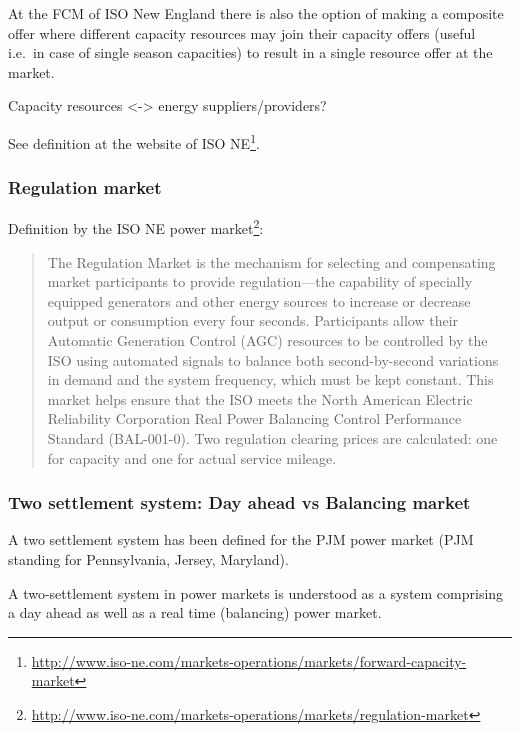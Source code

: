 At the FCM of ISO New England there is also the option of making a composite offer where different capacity resources may join their capacity offers (useful i.e.~in case of single season capacities) to result in a single resource offer at the market. 

Capacity resources <-> energy suppliers/providers?

See definition at the website of ISO NE\footnote{\url{http://www.iso-ne.com/markets-operations/markets/forward-capacity-market}}.

\subsubsection{Regulation market}

Definition by the ISO NE power market\footnote{\url{http://www.iso-ne.com/markets-operations/markets/regulation-market}}:

\begin{quote}
The Regulation Market is the mechanism for selecting and compensating market participants to provide regulation—the capability of specially equipped generators and other energy sources to increase or decrease output or consumption every four seconds. Participants allow their Automatic Generation Control (AGC) resources to be controlled by the ISO using automated signals to balance both second-by-second variations in demand and the system frequency, which must be kept constant. This market helps ensure that the ISO meets the North American Electric Reliability Corporation Real Power Balancing Control Performance Standard (BAL-001-0). Two regulation clearing prices are calculated: one for capacity and one for actual service mileage.
\end{quote}




\subsubsection{Two settlement system: Day ahead vs Balancing market}

A two settlement system has been defined for the PJM power market (PJM standing for Pennsylvania, Jersey, Maryland)\cite{lambert2001creating}. 

A two-settlement system in power markets is understood as a system comprising a day ahead as well as a real time (balancing) power market\cite{lambert2001creating}. 

